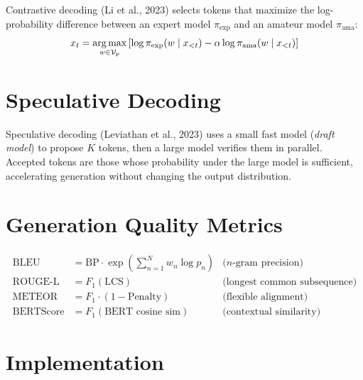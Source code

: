 \begin{definition}
Contrastive decoding (Li et al., 2023) selects tokens that maximize the
log-probability difference between an expert model $\pi_{\text{exp}}$ and an
amateur model $\pi_{\text{ama}}$:
\[
x_t = \operatorname*{arg\,max}_{w \in \mathcal{V}_p} \left[\log \pi_{\text{exp}}(w \mid x_{<t}) - \alpha \log \pi_{\text{ama}}(w \mid x_{<t})\right]
\]
\end{definition}

\section{Speculative Decoding}
\label{sec:gen:speculative}

\begin{definition}
Speculative decoding (Leviathan et al., 2023) uses a small fast model
(\emph{draft model}) to propose $K$ tokens, then a large model verifies them in
parallel. Accepted tokens are those whose probability under the large model is
sufficient, accelerating generation without changing the output distribution.
\end{definition}

\section{Generation Quality Metrics}
\label{sec:gen:metrics}

\begin{keyformulas}[title=\textbf{Generation metrics}]
\begin{align}
\text{BLEU} &= \text{BP} \cdot \exp\!\left(\sum_{n=1}^{N} w_n \log p_n\right) & \text{($n$-gram precision)} \\
\text{ROUGE-L} &= F_1(\text{LCS}) & \text{(longest common subsequence)} \\
\text{METEOR} &= F_1 \cdot (1 - \text{Penalty}) & \text{(flexible alignment)} \\
\text{BERTScore} &= F_1(\text{BERT cosine sim}) & \text{(contextual similarity)}
\end{align}
\end{keyformulas}

\section{Implementation}
\label{sec:gen:implementation}

